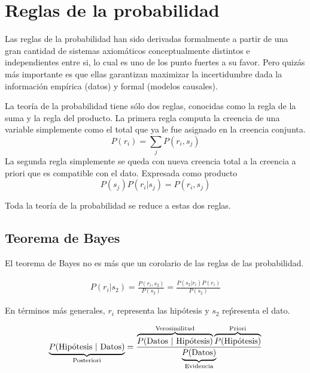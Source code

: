 \documentclass[a4paper,10pt]{book}
\theoremstyle{definition}
\begin{document}
\section{Reglas de la probabilidad}

Las reglas de la probabilidad han sido derivadas formalmente a partir de una gran cantidad de sistemas axiomáticos conceptualmente distintos e independientes entre si, lo cual es uno de los punto fuertes a su favor.
Pero quizás más importante es que ellas garantizan maximizar la incertidumbre dada la información empírica (datos) y formal (modelos causales).


La teoría de la probabilidad tiene sólo dos reglas, conocidas como la regla de la suma y la regla del producto.
La primera regla computa la creencia de una variable simplemente como el total que ya le fue asignado en la creencia conjunta.
\begin{equation}
P(r_i) = \sum_j P(r_i, s_j)
\end{equation}
La segunda regla simplemente se queda con nueva creencia total a la creencia a priori que es compatible con el dato.
Expresada como producto
\begin{equation}
P(s_j)P(r_i|s_j) = P(r_i, s_j)
\end{equation}

Toda la teoría de la probabilidad se reduce a estas dos reglas.

\subsection{Teorema de Bayes}

El teorema de Bayes no es más que un corolario de las reglas de las probabilidad.

\begin{equation}
\begin{split}
P(r_i|s_2) = \frac{P(r_i, s_2)}{P(s_2)} = \frac{P(s_2|r_i)P(r_i)}{P(s_2)} 
\end{split}
\end{equation}

En términos más generales, $r_i$ representa las hipótesis y $s_2$ reṕresenta el dato.

\begin{equation*}
\underbrace{P(\text{Hip\'otesis }|\text{ Datos})}_{\text{\scriptsize Posteriori}} = \frac{\overbrace{P(\text{Datos }|\text{ Hip\'otesis})}^{\text{\scriptsize Verosimilitud}} \overbrace{P(\text{Hip\'otesis})}^{\text{\scriptsize Priori}} }{\underbrace{P(\text{Datos})}_{\text{\scriptsize Evidencia}}}
\end{equation*}
\end{document}
